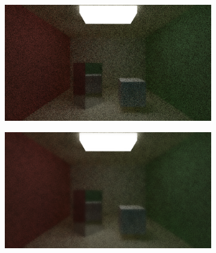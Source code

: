 \documentclass[titlepage,12pt]{report}
\begin{document}
\begin{figure}[H]
	\centering
	\begin{subfigure}{.48\textwidth}
		\centering
		\includegraphics[scale=0.2]{media/bilateral/cornell_normal_10_bilateral_filter_21_10_10.png}
		\label{bilateral_filter_5}
	\end{subfigure}
	\begin{subfigure}{.48\textwidth}
		\centering
		\includegraphics[scale=0.2]{media/bilateral/cornell_normal_10_bilateral_filter_21_10_20.png}
		\label{bilateral_filter_6}
	\end{subfigure}


\end{figure}
\end{document}
